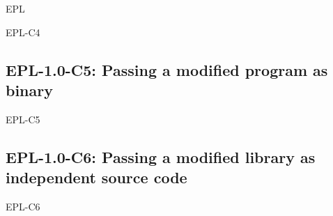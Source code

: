 \begin{license}{EPL}
\begin{lsuc}{EPL-C4}
  \begin{lsucprohibits}
    \lsucitem{\dontChangeCopyrightNotices}
    \lsucitem{\noPatentLitigation}
  \end{lsucprohibits}

\end{lsuc}

\subsection{EPL-1.0-C5: Passing a modified program as binary}
\begin{lsuc}{EPL-C5}



  \begin{lsucrequires}
    \lsucmandatory{\keepLicensingElements\ \addWhenCompiling}
    \lsucmandatory{\describeModifications}
    \lsucmandatory{\markAllModifications}
    \lsucmandatory{\organizeYourModifications}
    \lsucmandatory{\linkToRepo}
    \lsucoptional{\addToYourCopyrightNotice}
  \end{lsucrequires}

  \begin{lsucprohibits}
    \lsucitem{\dontChangeCopyrightNotices}
    \lsucitem{\noPatentLitigation}
  \end{lsucprohibits}

\end{lsuc}

\subsection{EPL-1.0-C6: Passing a modified library as independent source code}
\begin{lsuc}{EPL-C6}


\end{lsuc}
\end{license}
